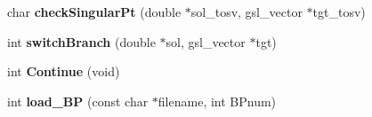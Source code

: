 \begin{DoxyCompactItemize}
\item 
\hypertarget{class_continuer_a71fd2e608a926971b9ddd91ab23badd9}{
char {\bfseries checkSingularPt} (double $\ast$sol\_\-tosv, gsl\_\-vector $\ast$tgt\_\-tosv)}
\label{class_continuer_a71fd2e608a926971b9ddd91ab23badd9}

\item 
\hypertarget{class_continuer_a8be1791fe689f14ca00d802a94c715bf}{
int {\bfseries switchBranch} (double $\ast$sol, gsl\_\-vector $\ast$tgt)}
\label{class_continuer_a8be1791fe689f14ca00d802a94c715bf}

\item 
\hypertarget{class_continuer_ab6a255a2ae3ad9951d333d57d8b1e0bc}{
int {\bfseries Continue} (void)}
\label{class_continuer_ab6a255a2ae3ad9951d333d57d8b1e0bc}

\item 
\hypertarget{class_continuer_a1667dc78e634697634a15dfbc65e0825}{
int {\bfseries load\_\-BP} (const char $\ast$filename, int BPnum)}
\label{class_continuer_a1667dc78e634697634a15dfbc65e0825}

\end{DoxyCompactItemize}
